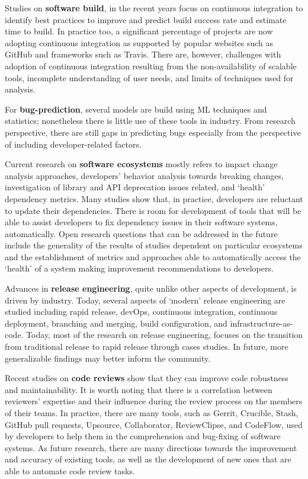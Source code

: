\documentclass[]{book}
\begin{document}
Studies on \textbf{software build}, in the recent years focus on
continuous integration to identify best practices to improve and predict
build success rate and estimate time to build. In practice too, a
significant percentage of projects are now adopting continuous
integration as supported by popular websites such as GitHub and
frameworks such as Travis. There are, however, challenges with adoption
of continuous integration resulting from the non-availability of
scalable tools, incomplete understanding of user needs, and limits of
techniques used for analysis.

For \textbf{bug-prediction}, several models are build using ML
techniques and statistics; nonetheless there is little use of these
tools in industry. From research perspective, there are still gaps in
predicting bugs especially from the perspective of including
developer-related factors.

Current research on \textbf{software ecosystems} mostly refers to impact
change analysis approaches, developers' behavior analysis towards
breaking changes, investigation of library and API deprecation issues
related, and `health' dependency metrics. Many studies show that, in
practice, developers are reluctant to update their dependencies. There
is room for development of tools that will be able to assist developers
to fix dependency issues in their software systems, automatically. Open
research questions that can be addressed in the future include the
generality of the results of studies dependent on particular ecosystems
and the establishment of metrics and approaches able to automatically
access the `health' of a system making improvement recommendations to
developers.

Advances in \textbf{release engineering}, quite unlike other aspects of
development, is driven by industry. Today, several aspects of `modern'
release engineering are studied including rapid release, devOps,
continuous integration, continuous deployment, branching and merging,
build configuration, and infrastructure-as-code. Today, most of the
research on release engineering, focuses on the transition from
traditional release to rapid release through cases studies. In future,
more generalizable findings may better inform the community.

Recent studies on \textbf{code reviews} show that they can improve code
robustness and maintainability. It is worth noting that there is a
correlation between reviewers' expertise and their influence during the
review process on the members of their teams. In practice, there are
many tools, such as Gerrit, Crucible, Stash, GitHub pull requests,
Upsource, Collaborator, ReviewClipse, and CodeFlow, used by developers
to help them in the comprehension and bug-fixing of software systems. As
future research, there are many directions towards the improvement and
accuracy of existing tools, as well as the development of new ones that
are able to automate code review tasks.
\end{document}
